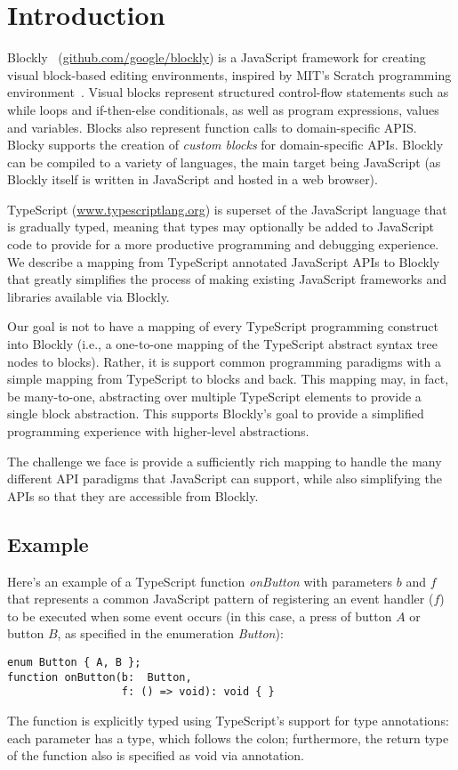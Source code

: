 \section{Introduction}

Blockly~\cite{Blocky2015} (\url{github.com/google/blockly}) 
is a JavaScript framework for creating visual block-based editing environments, 
inspired by MIT’s Scratch programming environment~\cite{ScratchCACM2009}.  Visual blocks represent structured 
control-flow statements such as while loops and if-then-else conditionals, as well as program expressions,
values and variables. 
Blocks also represent function calls to domain-specific APIS. Blocky supports the creation of \emph{custom 
blocks} for domain-specific APIs. Blockly can be compiled to a variety of languages, the main target 
being JavaScript (as Blockly itself is written in JavaScript and hosted in a web browser).

TypeScript (\url{www.typescriptlang.org}) is superset of the JavaScript language that is gradually typed, 
meaning that types may 
optionally be added to JavaScript code to provide for a more productive programming and debugging experience. 
We describe a mapping from TypeScript annotated JavaScript APIs to Blockly that greatly simplifies 
the process of making existing JavaScript frameworks and libraries available via Blockly.

Our goal is not to have a mapping of every TypeScript programming construct into Blockly 
(i.e., a one-to-one mapping of the TypeScript abstract syntax tree nodes to blocks).
Rather, it is support common programming paradigms with a simple mapping
from TypeScript to blocks and back.  This mapping may, in fact, be many-to-one, 
abstracting over multiple TypeScript elements to provide a single block abstraction.
This supports Blockly's goal to provide a simplified programming experience 
with higher-level abstractions. 

The challenge we face is provide a sufficiently rich mapping to handle the
many different API paradigms that JavaScript can support, while
also simplifying the APIs so that they are accessible from Blockly. 

\subsection{Example}

Here's an example of a TypeScript function \emph{onButton} 
with parameters $b$ and $f$
that represents a common JavaScript pattern of registering an event
handler ($f$) to be executed when some event occurs (in this case, 
a press of button $A$ or button $B$, as specified in the enumeration
\emph{Button}):
\begin{lstlisting}
enum Button { A, B };
function onButton(b:  Button, 
                  f: () => void): void { }
\end{lstlisting}
The function is explicitly typed using TypeScript's support for
type annotations: each parameter has a type, which follows the colon;
furthermore, the return type of the function also is specified as void
via annotation. 

